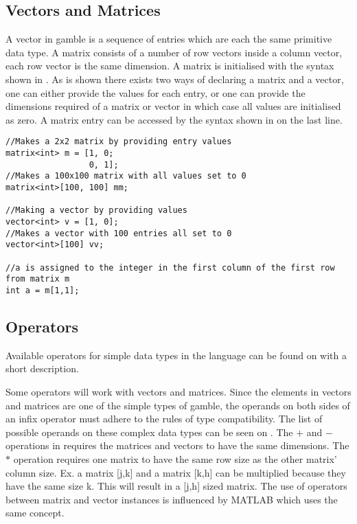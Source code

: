 \subsection*{Vectors and Matrices}
A vector in \gls{gamble} is a sequence of entries which are each the same primitive data type. 
A matrix consists of a number of row vectors inside a column vector, each row vector is the same dimension. 
A matrix is initialised with the syntax shown in .
As is shown there exists two ways of declaring a matrix and a vector, one can either provide the values for each entry, or one can provide the dimensions required of a matrix or vector in which case all values are initialised as zero.
A matrix entry can be accessed by the syntax shown in  on the last line.

\begin{lstlisting}[caption={Syntax for creating a matrix or vector},label={lst:matrix},numbers=none]
//Makes a 2x2 matrix by providing entry values
matrix<int> m = [1, 0; 
                 0, 1];
//Makes a 100x100 matrix with all values set to 0
matrix<int>[100, 100] mm;

//Making a vector by providing values
vector<int> v = [1, 0];
//Makes a vector with 100 entries all set to 0
vector<int>[100] vv;

//a is assigned to the integer in the first column of the first row from matrix m
int a = m[1,1];   
\end{lstlisting}

\subsection*{Operators}\label{subsec:operators}
Available operators for simple data types in the language can be found on  with a short description.  


Some operators will work with vectors and matrices.
Since the elements in vectors and matrices are one of the simple types of \gls{gamble}, the operands on both sides of an infix operator must adhere to the rules of type compatibility.
The list of possible operands on these complex data types can be seen on .
The $+$ and $-$ operations in  requires the matrices and vectors to have the same dimensions.
The $*$ operation requires one matrix to have the same row size as the other matrix' column size. Ex. a matrix [j,k] and a matrix [k,h] can be multiplied because they have the same size k.
This will result in a [j,h] sized matrix.
The use of operators between matrix and vector instances is influenced by MATLAB which uses the same concept.

